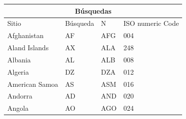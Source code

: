 \documentclass{article}
\begin{document}
\begin{center}
\begin{tabular}{ |p{3cm}||p{5cm}|p{1cm}|p{3cm}|  }
 \hline
 \multicolumn{4}{|c|}{Búsquedas} \\
 \hline
 Sitio& Búsqueda &N&ISO numeric Code\\
 \hline
 Afghanistan   & AF    &AFG&   004\\
 Aland Islands&   AX  & ALA   &248\\
 Albania &AL & ALB&  008\\
 Algeria    &DZ & DZA&  012\\
 American Samoa&   AS  & ASM&016\\
 Andorra& AD  & AND   &020\\
 Angola& AO  & AGO&024\\
 \hline
\end{tabular}
\end{center}
\end{document}
